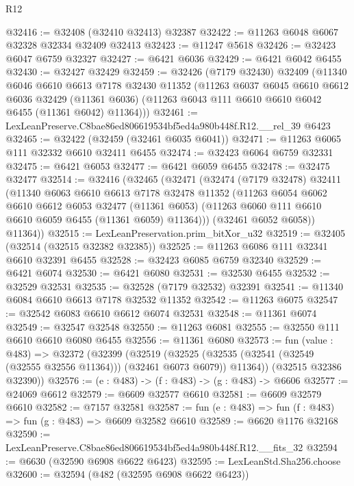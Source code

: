 \begin{lexlean}{R12}
\begin{coremodule}
@32416 := @32408 (@32410 @32413) @32387
@32422 := @11263 @6048 @6067 @32328 @32334 @32409 @32413
@32423 := @11247 @5618
@32426 := @32423 @6047 @6759 @32327
@32427 := @6421 @6036
@32429 := @6421 @6042 @6455
@32430 := @32427 @32429
@32459 := @32426
    (@7179 @32430)
    @32409
    (@11340
      @6046
      @6610
      @6613
      @7178
      @32430
      @11352
      (@11263
        @6037
        @6045
        @6610
        @6612
        @6036
        @32429
        (@11361 @6036)
        (@11263 @6043 @111 @6610 @6610 @6042 @6455 (@11361 @6042) @11364)))
@32461 := LexLeanPreserve.C8bae86ed806619534bf5ed4a980b448f.R12.__rel_39 @6423
@32465 := @32422 (@32459 (@32461 @6035 @6041))
@32471 := @11263 @6065 @111 @32332 @6610 @32411 @6455
@32474 := @32423 @6064 @6759 @32331
@32475 := @6421 @6053
@32477 := @6421 @6059 @6455
@32478 := @32475 @32477
@32514 := @32416
    (@32465
      (@32471
        (@32474
          (@7179 @32478)
          @32411
          (@11340
            @6063
            @6610
            @6613
            @7178
            @32478
            @11352
            (@11263
              @6054
              @6062
              @6610
              @6612
              @6053
              @32477
              (@11361 @6053)
              (@11263 @6060 @111 @6610 @6610 @6059 @6455 (@11361 @6059) @11364)))
          (@32461 @6052 @6058))
        @11364))
@32515 := LexLeanPreservation.prim_bitXor_u32
@32519 := @32405 (@32514 (@32515 @32382 @32385))
@32525 := @11263 @6086 @111 @32341 @6610 @32391 @6455
@32528 := @32423 @6085 @6759 @32340
@32529 := @6421 @6074
@32530 := @6421 @6080
@32531 := @32530 @6455
@32532 := @32529 @32531
@32535 := @32528 (@7179 @32532) @32391
@32541 := @11340 @6084 @6610 @6613 @7178 @32532 @11352
@32542 := @11263 @6075
@32547 := @32542 @6083 @6610 @6612 @6074 @32531
@32548 := @11361 @6074
@32549 := @32547 @32548
@32550 := @11263 @6081
@32555 := @32550 @111 @6610 @6610 @6080 @6455
@32556 := @11361 @6080
@32573 := fun (value : @483) =>
  @32372
    (@32399
      (@32519
        (@32525 (@32535 (@32541 (@32549 (@32555 @32556 @11364))) (@32461 @6073 @6079)) @11364))
      (@32515 @32386 @32390))
@32576 := (e : @483) -> (f : @483) -> (g : @483) -> @6606
@32577 := @24069 @6612
@32579 := @6609 @32577 @6610
@32581 := @6609 @32579 @6610
@32582 := @7157 @32581
@32587 := fun (e : @483) => fun (f : @483) => fun (g : @483) => @6609 @32582 @6610
@32589 := @6620 @1176 @32168
@32590 := LexLeanPreserve.C8bae86ed806619534bf5ed4a980b448f.R12.__fits_32
@32594 := @6630 (@32590 @6908 @6622 @6423)
@32595 := LexLeanStd.Sha256.choose
@32600 := @32594 (@482 (@32595 @6908 @6622 @6423))

\end{coremodule}
\end{lexlean}
